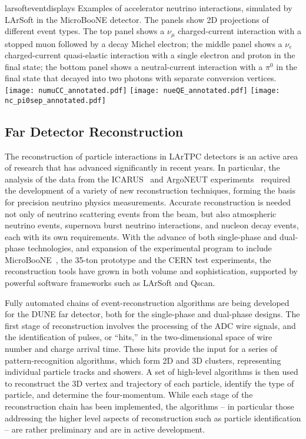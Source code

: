 \begin{cdrfigure}{larsofteventdisplays}
{Examples of accelerator neutrino interactions, simulated by LArSoft in the 
MicroBooNE detector. The panels show 2D projections of different event types.
The top panel shows a $\nu_{\mu}$ charged-current interaction with a stopped muon followed
by a decay Michel electron; the middle panel shows a $\nu_{e}$ charged-current 
quasi-elastic interaction with a single electron and proton in the final state;
the bottom panel shows a neutral-current interaction with a $\pi^{0}$ in the final state
that decayed into two photons with separate conversion vertices.}
\texttt{[image: numuCC\_annotated.pdf]}
\texttt{[image: nueQE\_annotated.pdf]}
\texttt{[image: nc\_pi0sep\_annotated.pdf]}
\end{cdrfigure}

\subsection{Far Detector Reconstruction}
\label{sec:detectors-sc-physics-software-reconstruction-fd}

The reconstruction of particle interactions in LArTPC
detectors is an active area of research that has advanced significantly in recent years.
In particular, the analysis of the data from the ICARUS~\cite{Amerio:2004ze,icarus-url,ICARUS-pizero,Antonello:2012hu} 
and ArgoNEUT experiments~\cite{Adamson:2013/02/28tla,argoneut-url,Acciarri:2013met}
required the development of a variety of new reconstruction techniques,
forming the basis for precision neutrino physics measurements.
Accurate reconstruction is needed not only of neutrino scattering events from the beam, but also atmospheric neutrino events,
supernova burst neutrino interactions, and nucleon decay events, each with its own requirements.
With the advance of both single-phase and dual-phase technologies,
and expansion of the experimental program to include MicroBooNE~\cite{Chen:2007ae,microboone-url},
the 35-ton prototype and the CERN test experiments,
the reconstruction tools have grown in both volume and sophistication,
supported by powerful software frameworks such as LArSoft and Qscan.

Fully automated chains of event-reconstruction algorithms
are being developed for the DUNE far detector, both for the single-phase and dual-phase designs.
The first stage of reconstruction involves the processing of the
ADC wire signals, and the identification of pulses, or ``hits,'' in the 
two-dimensional space of wire number and charge arrival time. 
These hits provide the input for a series of pattern-recognition algorithms,
which form 2D and 3D clusters, representing individual particle tracks and showers.
A set of high-level algorithms is then used to reconstruct the 
3D vertex and trajectory of each particle, identify the type of particle, and determine the four-momentum.
While each stage of the reconstruction chain has been implemented, the algorithms -- in
particular those addressing the higher level aspects of reconstruction such as particle identification -- are
rather preliminary and are in active development.


